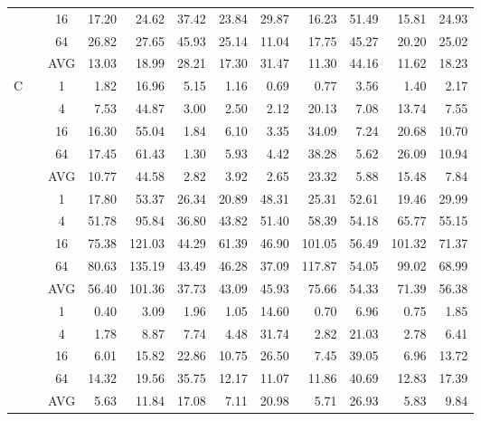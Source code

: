 \begin{table}[]
\begin{center}
{\begin{tabular}{|c|c|c|n{3}{1}n{3}{1}n{3}{1}n{3}{1}n{3}{1}n{3}{1}n{3}{1}n{3}{1}|n{3}{1}|}
 & & 16                             & 17.20 &  24.62 & 37.42 & 23.84 & 29.87 &  16.23 & 51.49 &  15.81 & 24.93  \\
 & & 64                             & 26.82 &  27.65 & 45.93 & 25.14 & 11.04 &  17.75 & 45.27 &  20.20 & 25.02  \\ 
 & & AVG                            & 13.03 &  18.99 & 28.21 & 17.30 & 31.47 &  11.30 & 44.16 &  11.62 & {\boldmath}18.23  \\ \hline
  &  & 1  &  1.82 &  16.96 &  5.15 &  1.16 &  0.69 &   0.77 &  3.56 &   1.40 &  2.17  \\
 & & 4                                                 &  7.53 &  44.87 &  3.00 &  2.50 &  2.12 &  20.13 &  7.08 &  13.74 &  7.55  \\
 & & 16                                                & 16.30 &  55.04 &  1.84 &  6.10 &  3.35 &  34.09 &  7.24 &  20.68 & 10.70  \\
 & & 64                                                & 17.45 &  61.43 &  1.30 &  5.93 &  4.42 &  38.28 &  5.62 &  26.09 & 10.94  \\ 
 & & AVG                                               & 10.77 &  44.58 &  2.82 &  3.92 &  2.65 &  23.32 &  5.88 &  15.48 &  {\boldmath}7.84  \\ 
 &  & 1 & 17.80 &  53.37 & 26.34 & 20.89 & 48.31 &  25.31 & 52.61 &  19.46 & 29.99 \\
 & & 4                            & 51.78 &  95.84 & 36.80 & 43.82 & 51.40 &  58.39 & 54.18 &  65.77 & 55.15 \\
 & & 16                           & 75.38 & 121.03 & 44.29 & 61.39 & 46.90 & 101.05 & 56.49 & 101.32 & 71.37 \\
 & & 64                           & 80.63 & 135.19 & 43.49 & 46.28 & 37.09 & 117.87 & 54.05 &  99.02 & 68.99 \\ 
 & & AVG                          & 56.40 & 101.36 & 37.73 & 43.09 & 45.93 &  75.66 & 54.33 &  71.39 & {\boldmath}56.38  \\ 
 &  & 1 &  0.40 &   3.09 &  1.96 &  1.05 & 14.60 &   0.70 &  6.96 &   0.75 &  1.85  \\
 & & 4                            &  1.78 &   8.87 &  7.74 &  4.48 & 31.74 &   2.82 & 21.03 &   2.78 &  6.41  \\
 & & 16                           &  6.01 &  15.82 & 22.86 & 10.75 & 26.50 &   7.45 & 39.05 &   6.96 & 13.72  \\
 & & 64                           & 14.32 &  19.56 & 35.75 & 12.17 & 11.07 &  11.86 & 40.69 &  12.83 & 17.39  \\ 
 & & AVG                          &  5.63 &  11.84 & 17.08 &  7.11 & 20.98 &   5.71 & 26.93 &   5.83 &  {\boldmath}9.84  \\ \hline
\end{tabular}}
\end{center}
\end{table}

\fi
